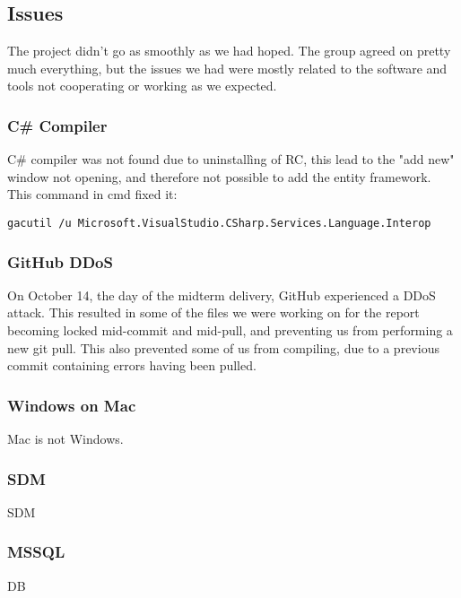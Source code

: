\subsection{Issues}
The project didn't go as smoothly as we had hoped. The group agreed on pretty much everything, but the issues we had were mostly related to the software and tools not cooperating or working as we expected.

\subsubsection{C\# Compiler}
C\# compiler was not found due to uninstallìng of RC, this lead to the "add new" window not opening, and therefore not possible to add the entity framework.\\ %
This command in cmd fixed it:
\begin{verbatim}
gacutil /u Microsoft.VisualStudio.CSharp.Services.Language.Interop 
\end{verbatim}

\subsubsection{GitHub DDoS}
On October 14, the day of the midterm delivery, GitHub experienced a DDoS attack. This resulted in some of the files we were working on for the report becoming locked mid-commit and mid-pull, and preventing us from performing a new git pull. This also prevented some of us from compiling, due to a previous commit containing errors having been pulled.

\subsubsection{Windows on Mac}
Mac is not Windows. %

\subsubsection{SDM}
SDM %

\subsubsection{MSSQL}
DB


